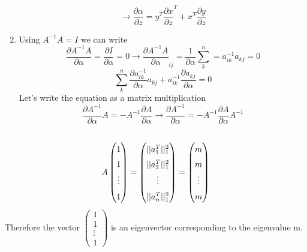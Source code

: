 \documentclass{article}
\begin{document}
\begin{enumerate}[label=(\roman*)]
\begin{equation}
    \rightarrow \frac{\partial \alpha}{\partial z} = y^T \frac{\partial x}{\partial z}^{T} + x^T \frac{\partial y}{\partial z}
\end{equation}
\item
Using $A^{-1} A = I$ we can write
\begin{equation}
   \frac{\partial A^{-1}A}{\partial \alpha} = \frac{\partial I}{\partial \alpha} = 0 \rightarrow \frac{\partial A^{-1}A}{\partial \alpha}_{ij} = \frac{1}{\partial \alpha} \sum_{k}^{n} = a^{-1}_{ik}a_{kj} = 0
\end{equation}
\begin{equation}
   \sum_{k}^{n} \frac{\partial a^{-1}_{ik}}{\partial \alpha} a_{kj} + a^{-1}_{ik}\frac{\partial a_{kj}}{\partial\alpha} = 0
\end{equation}
Let's write the equation as a matrix multiplication
\begin{equation}
    \frac{\partial A^{-1}}{\partial \alpha} A = - A^{-1} \frac{\partial A}{\partial \alpha} \rightarrow \frac{\partial A^{-1}}{\partial \alpha} = -A^{-1}\frac{\partial A}{\partial \alpha} A^{-1}
\end{equation}
\end{enumerate}
\subsection{}
\begin{equation}
    A
    \begingroup
    \renewcommand*{\arraystretch}{1.5}
    \begin{pmatrix}
    1 \\ 
    1 \\
    \vdots \\
    1
    \end{pmatrix}
    =
    \begin{pmatrix}
    ||a^{T}_1||^{2}_{1} \\
    ||a^{T}_2||^{2}_{1} \\
    \vdots \\
    ||a^{T}_n||^{2}_{1}
    \end{pmatrix}
    = 
    \begin{pmatrix}
    m \\
    m \\
    \vdots \\
    m
    \end{pmatrix}
    \endgroup
\end{equation}
Therefore the vector  $ \begin{pmatrix}
    1 \\ 
    1 \\
    \vdots \\
    1
    \end{pmatrix}$ is an eigenvector corresponding to the eigenvalue m.
\end{document}
